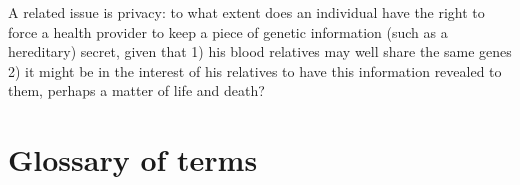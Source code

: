 \documentclass{article}
\begin{document}
A related issue is  privacy: to what extent does an individual have the right to force a health provider to keep a piece of genetic information (such as a hereditary) secret, given that 1) his blood relatives may well share the same genes 2) it might be in the interest of his relatives to have this information revealed to them, perhaps a matter of life and death?


\section{Glossary of terms}


\end{document}
